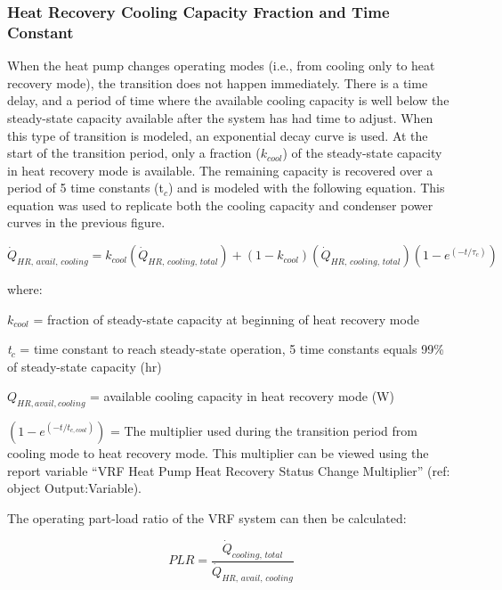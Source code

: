 \subsubsection{Heat Recovery Cooling Capacity Fraction and Time Constant}\label{heat-recovery-cooling-capacity-fraction-and-time-constant}

When the heat pump changes operating modes (i.e., from cooling only to heat recovery mode), the transition does not happen immediately. There is a time delay, and a period of time where the available cooling capacity is well below the steady-state capacity available after the system has had time to adjust. When this type of transition is modeled, an exponential decay curve is used. At the start of the transition period, only a fraction (\(k_{cool}\)) of the steady-state capacity in heat recovery mode is available. The remaining capacity is recovered over a period of 5 time constants (t\(_{c}\)) and is modeled with the following equation. This equation was used to replicate both the cooling capacity and condenser power curves in the previous figure.

\begin{equation}
  \dot{Q}_{HR,\,avail,\,cooling} = k_{cool} \left( \dot{Q}_{HR,\,cooling,\,total} \right) + \left( 1 - k_{cool} \right) \left( \dot{Q}_{HR,\,cooling,\,total} \right) \left( 1 - e^{\left( -t / \tau_c \right)}  \right)
\end{equation}

where:

\(k_{cool}\) = fraction of steady-state capacity at beginning of heat recovery mode

\emph{t}\(_c\) = time constant to reach steady-state operation, 5 time constants equals 99\% of steady-state capacity (hr)

\(Q_{HR,avail,cooling}\) = available cooling capacity in heat recovery mode (W)

\(\left( 1 - e^{\left( -t / t_{c,cool} \right)} \right)\) = The multiplier used during the transition period from cooling mode to heat recovery mode. This multiplier can be viewed using the report variable ``VRF Heat Pump Heat Recovery Status Change Multiplier'' (ref: object Output:Variable).

The operating part-load ratio of the VRF system can then be calculated:

\begin{equation}
  PLR = \frac{\dot{Q}_{cooling,\,total}}{\dot{Q}_{HR,\,avail,\,cooling}}
\end{equation}

